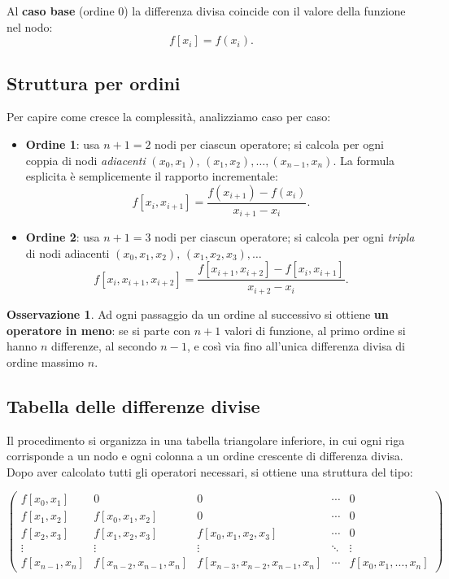 \documentclass[a4paper,12pt]{article}
\theoremstyle{definition}
\newtheorem{osservazione}{Osservazione}[section]
\theoremstyle{remark}
\begin{document}
Al \textbf{caso base} (ordine $0$) la differenza divisa coincide con il
valore della funzione nel nodo:
\[
  f[x_i] = f(x_i).
\]

\subsection{Struttura per ordini}

Per capire come cresce la complessità, analizziamo caso per caso:
\begin{itemize}
  \item \textbf{Ordine 1}: usa $n+1 = 2$ nodi per ciascun operatore;
    si calcola per ogni coppia di nodi \emph{adiacenti}
    $(x_0, x_1),\,(x_1,x_2),\ldots,(x_{n-1},x_n)$. La formula esplicita
    è semplicemente il rapporto incrementale:
    \[
      f[x_i, x_{i+1}] = \frac{f(x_{i+1}) - f(x_i)}{x_{i+1} - x_i}.
    \]
  \item \textbf{Ordine 2}: usa $n+1 = 3$ nodi per ciascun operatore;
    si calcola per ogni \emph{tripla} di nodi adiacenti
    $(x_0,x_1,x_2),\,(x_1,x_2,x_3),\ldots$
    \[
      f[x_i,x_{i+1},x_{i+2}]
      = \frac{f[x_{i+1},x_{i+2}] - f[x_i,x_{i+1}]}{x_{i+2}-x_i}.
    \]
\end{itemize}

\begin{osservazione}
Ad ogni passaggio da un ordine al successivo si ottiene
\textbf{un operatore in meno}: se si parte con $n+1$ valori di funzione,
al primo ordine si hanno $n$ differenze, al secondo $n-1$, e così via
fino all'unica differenza divisa di ordine massimo $n$.
\end{osservazione}

\subsection{Tabella delle differenze divise}

Il procedimento si organizza in una tabella triangolare inferiore, in
cui ogni riga corrisponde a un nodo e ogni colonna a un ordine crescente
di differenza divisa. Dopo aver calcolato tutti gli operatori necessari,
si ottiene una struttura del tipo:

\[
\begin{pmatrix}
f[x_0,x_1]       & 0                   & 0                       & \cdots & 0 \\
f[x_1,x_2]       & f[x_0,x_1,x_2]      & 0                       & \cdots & 0 \\
f[x_2,x_3]       & f[x_1,x_2,x_3]      & f[x_0,x_1,x_2,x_3]      & \cdots & 0 \\
\vdots            & \vdots              & \vdots                  & \ddots & \vdots \\
f[x_{n-1},x_n]   & f[x_{n-2},x_{n-1},x_n] & f[x_{n-3},x_{n-2},x_{n-1},x_n] & \cdots & f[x_0,x_1,\ldots,x_n]
\end{pmatrix}
\]
\end{document}
